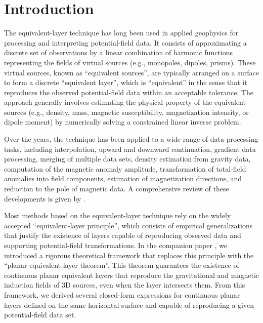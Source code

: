 \section{Introduction}

The equivalent-layer technique has long been used in applied geophysics for processing and interpreting potential-field data. 
It consists of approximating a discrete set of observations by a linear combination of harmonic functions representing 
the fields of virtual sources (e.g., monopoles, dipoles, prisms). These virtual sources, known as ``equivalent sources'', 
are typically arranged on a surface to form a discrete ``equivalent layer'', which is ``equivalent'' in the sense that it 
reproduces the observed potential-field data within an acceptable tolerance. The approach generally involves estimating 
the physical property of the equivalent sources (e.g., density, mass, magnetic susceptibility, magnetization 
intensity, or dipole moment) by numerically solving a constrained linear inverse problem.

Over the years, the technique has been applied to a wide range of data-processing tasks, including 
interpolation, upward and downward continuation, gradient data processing, merging of multiple data sets, 
density estimation from gravity data, computation of the magnetic anomaly amplitude, transformation of total-field 
anomalies into field components, estimation of magnetization directions, and reduction to the pole of magnetic data. 
A comprehensive review of these developments is given by \cite{oliveirajr_etal2023}.

Most methods based on the equivalent-layer technique rely on the widely accepted ``equivalent-layer principle'', 
which consists of empirical generalizations that justify the existence of layers capable of reproducing observed 
data and supporting potential-field transformations. In the companion paper \citep{oliveirajr_etal2026_1}, we introduced 
a rigorous theoretical framework that replaces this principle 
with the ``planar equivalent-layer theorem''. This theorem guarantees the existence of continuous planar equivalent 
layers that reproduce the gravitational and magnetic induction fields of 3D sources, even when the layer 
intersects them. From this framework, we derived several closed-form expressions for continuous planar layers 
defined on the same horizontal surface and capable of reproducing a given potential-field data set.

